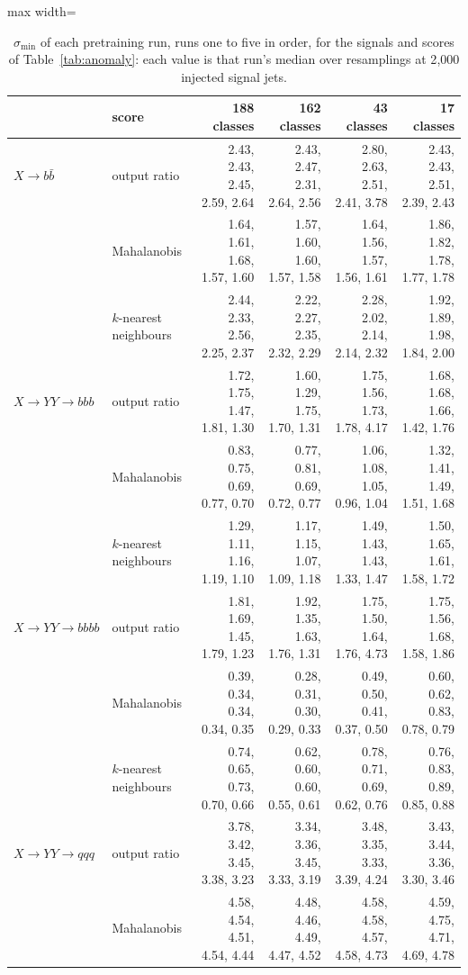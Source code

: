 \begin{table}[t]
\centering
\small
\setlength{\tabcolsep}{4pt}
\caption{$\sigma_{\min}$ of each pretraining run, runs one to five in order, for the signals and scores of Table~\ref{tab:anomaly}: each value is that run's median over resamplings at 2{,}000 injected signal jets.}
\label{tab:anomaly-per-run}
\begin{adjustbox}{max width=\linewidth}
\begin{tabular}{l l rrrr}
\toprule
& score & 188 classes & 162 classes & 43 classes & 17 classes \\
\midrule
$X\to b\bar b$ & output ratio & 2.43, 2.43, 2.45, 2.59, 2.64 & 2.43, 2.47, 2.31, 2.64, 2.56 & 2.80, 2.63, 2.51, 2.41, 3.78 & 2.43, 2.43, 2.51, 2.39, 2.43 \\
 & Mahalanobis & 1.64, 1.61, 1.68, 1.57, 1.60 & 1.57, 1.60, 1.60, 1.57, 1.58 & 1.64, 1.56, 1.57, 1.56, 1.61 & 1.86, 1.82, 1.78, 1.77, 1.78 \\
 & $k$-nearest neighbours & 2.44, 2.33, 2.56, 2.25, 2.37 & 2.22, 2.27, 2.35, 2.32, 2.29 & 2.28, 2.02, 2.14, 2.14, 2.32 & 1.92, 1.89, 1.98, 1.84, 2.00 \\
\addlinespace
$X\to YY\to bbb$ & output ratio & 1.72, 1.75, 1.47, 1.81, 1.30 & 1.60, 1.29, 1.75, 1.70, 1.31 & 1.75, 1.56, 1.73, 1.78, 4.17 & 1.68, 1.68, 1.66, 1.42, 1.76 \\
 & Mahalanobis & 0.83, 0.75, 0.69, 0.77, 0.70 & 0.77, 0.81, 0.69, 0.72, 0.77 & 1.06, 1.08, 1.05, 0.96, 1.04 & 1.32, 1.41, 1.49, 1.51, 1.68 \\
 & $k$-nearest neighbours & 1.29, 1.11, 1.16, 1.19, 1.10 & 1.17, 1.15, 1.07, 1.09, 1.18 & 1.49, 1.43, 1.43, 1.33, 1.47 & 1.50, 1.65, 1.61, 1.58, 1.72 \\
\addlinespace
$X\to YY\to bbbb$ & output ratio & 1.81, 1.69, 1.45, 1.79, 1.23 & 1.92, 1.35, 1.63, 1.76, 1.31 & 1.75, 1.50, 1.64, 1.76, 4.73 & 1.75, 1.56, 1.68, 1.58, 1.86 \\
 & Mahalanobis & 0.39, 0.34, 0.34, 0.34, 0.35 & 0.28, 0.31, 0.30, 0.29, 0.33 & 0.49, 0.50, 0.41, 0.37, 0.50 & 0.60, 0.62, 0.83, 0.78, 0.79 \\
 & $k$-nearest neighbours & 0.74, 0.65, 0.73, 0.70, 0.66 & 0.62, 0.60, 0.60, 0.55, 0.61 & 0.78, 0.71, 0.69, 0.62, 0.76 & 0.76, 0.83, 0.89, 0.85, 0.88 \\
\addlinespace
$X\to YY\to qqq$ & output ratio & 3.78, 3.42, 3.45, 3.38, 3.23 & 3.34, 3.36, 3.45, 3.33, 3.19 & 3.48, 3.35, 3.33, 3.39, 4.24 & 3.43, 3.44, 3.36, 3.30, 3.46 \\
 & Mahalanobis & 4.58, 4.54, 4.51, 4.54, 4.44 & 4.48, 4.46, 4.49, 4.47, 4.52 & 4.58, 4.58, 4.57, 4.58, 4.73 & 4.59, 4.75, 4.71, 4.69, 4.78 \\

\end{tabular}
\end{adjustbox}
\end{table}
